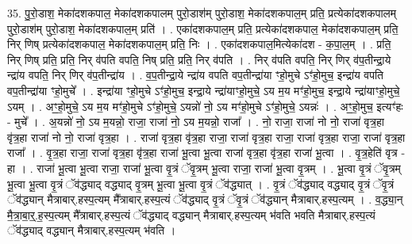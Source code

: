 \documentclass[17pt]{extarticle}
\begin{document}
35. पु॒रो॒डाश॒ मेका॑दशकपाल॒ मेका॑दशकपालम् पुरो॒डाश॑म् पुरो॒डाश॒ मेका॑दशकपाल॒म् प्रति॒ प्रत्येका॑दशकपालम् पुरो॒डाश॑म् पुरो॒डाश॒ मेका॑दशकपाल॒म् प्रति॑ । . एका॑दशकपाल॒म् प्रति॒ प्रत्येका॑दशकपाल॒ मेका॑दशकपाल॒म् प्रति॒ निर् णिष् प्रत्येका॑दशकपाल॒ मेका॑दशकपाल॒म् प्रति॒ निः । . एका॑दशकपाल॒मित्येका॑दश - क॒पा॒ल॒म् । . प्रति॒ निर् णिष् प्रति॒ प्रति॒ निर् व॑पति वपति॒ निष् प्रति॒ प्रति॒ निर् व॑पति । . निर् व॑पति वपति॒ निर् णिर् व॑प॒तीन्द्रा॒ये न्द्रा॑य वपति॒ निर् णिर् व॑प॒तीन्द्रा॑य । . व॒प॒तीन्द्रा॒ये न्द्रा॑य वपति वप॒तीन्द्रा॑या ꣳहो॒मुचे ऽꣳ॑हो॒मुच॒ इन्द्रा॑य वपति वप॒तीन्द्रा॑या ꣳहो॒मुचे᳚ । . इन्द्रा॑या ꣳहो॒मुचे ऽꣳ॑हो॒मुच॒ इन्द्रा॒ये न्द्रा॑याꣳहो॒मुचे॒ ऽय म॒य मꣳ॑हो॒मुच॒ इन्द्रा॒ये न्द्रा॑याꣳहो॒मुचे॒ ऽयम् । . अꣳ॒॒हो॒मुचे॒ ऽय म॒य मꣳ॑हो॒मुचे ऽꣳ॑हो॒मुचे॒ ऽयन्नो॑ नो॒ ऽय मꣳ॑हो॒मुचे ऽꣳ॑हो॒मुचे॒ ऽयन्नः॑ । . अꣳ॒॒हो॒मुच॒ इत्यꣳ॑हः - मुचे᳚ । . अ॒यन्नो॑ नो॒ ऽय म॒यन्नो॒ राजा॒ राजा॑ नो॒ ऽय म॒यन्नो॒ राजा᳚ । . नो॒ राजा॒ राजा॑ नो नो॒ राजा॑ वृत्र॒हा वृ॑त्र॒हा राजा॑ नो नो॒ राजा॑ वृत्र॒हा । . राजा॑ वृत्र॒हा वृ॑त्र॒हा राजा॒ राजा॑ वृत्र॒हा राजा॒ राजा॑ वृत्र॒हा राजा॒ राजा॑ वृत्र॒हा राजा᳚ । . वृ॒त्र॒हा राजा॒ राजा॑ वृत्र॒हा वृ॑त्र॒हा राजा॑ भू॒त्वा भू॒त्वा राजा॑ वृत्र॒हा वृ॑त्र॒हा राजा॑ भू॒त्वा । . वृ॒त्र॒हेति॑ वृत्र - हा । . राजा॑ भू॒त्वा भू॒त्वा राजा॒ राजा॑ भू॒त्वा वृ॒त्रं ॅवृ॒त्रम् भू॒त्वा राजा॒ राजा॑ भू॒त्वा वृ॒त्रम् । . भू॒त्वा वृ॒त्रं ॅवृ॒त्रम् भू॒त्वा भू॒त्वा वृ॒त्रं ॅव॑द्ध्याद् वद्ध्याद् वृ॒त्रम् भू॒त्वा भू॒त्वा वृ॒त्रं ॅव॑द्ध्यात् । . वृ॒त्रं ॅव॑द्ध्याद् वद्ध्याद् वृ॒त्रं ॅवृ॒त्रं ॅव॑द्ध्यान् मैत्राबार्.हस्प॒त्यम् मै᳚त्राबार्.हस्प॒त्यं ॅव॑द्ध्याद् वृ॒त्रं ॅवृ॒त्रं ॅव॑द्ध्यान् मैत्राबार्.हस्प॒त्यम् । . व॒द्ध्या॒न् मै॒त्रा॒बा॒र्॒.ह॒स्प॒त्यम् मै᳚त्राबार्.हस्प॒त्यं ॅव॑द्ध्याद् वद्ध्यान् मैत्राबार्.हस्प॒त्यम् भ॑वति भवति मैत्राबार्.हस्प॒त्यं ॅव॑द्ध्याद् वद्ध्यान् मैत्राबार्.हस्प॒त्यम् भ॑वति । \newline
\end{document}
